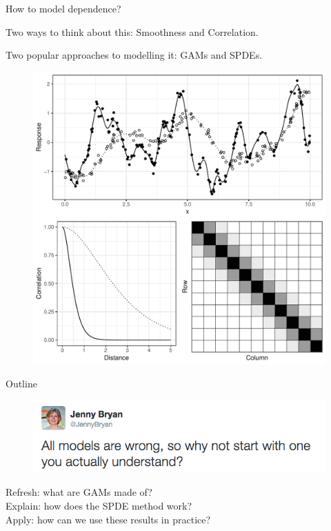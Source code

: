 \documentclass{beamer}
\begin{document}
\begin{frame}{How to model dependence?} 

Two ways to think about this: Smoothness and Correlation. 

Two popular approaches to modelling it: GAMs and SPDEs. 

  \begin{figure}[h]
    \begin{center}
      \includegraphics[height=0.7\textheight]{figures/smooth_corr.pdf}
    \end{center}
  \end{figure}

\end{frame}

\begin{frame}{Outline}

  \begin{figure}[t]
    \begin{center}
      \includegraphics[width=\textwidth]{figures/jenny_models.png}
    \end{center}
  \end{figure}

{\Large
Refresh: what are GAMs made of? \\
Explain: how does the SPDE method work?\\
Apply: how can we use these results in practice?
}

\end{frame}
\end{document}
